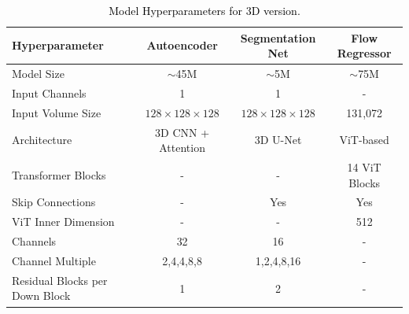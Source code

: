 \documentclass[twoside]{article}
\newcommand{\bc}[1]{\textcolor{black}{#1}}
\begin{document}
\vspace{0.5cm}

\begin{table}[th]
\centering
\caption{\bc{Model Hyperparameters for 3D version.}}
\label{tab:3d_all_params}
\begin{tabular}{lccc}
\toprule
\textbf{Hyperparameter}         & \textbf{Autoencoder}     & \textbf{Segmentation Net} & \textbf{Flow Regressor} \\
\midrule
Model Size                      & $\sim$45M          & $\sim$5M             & $\sim$75M          \\
Input Channels                  & 1                           & 1                             & -                           \\
Input Volume Size               & $128 \times 128 \times 128$  & $128 \times 128 \times 128$  & 131,072                     \\
Architecture                   & 3D CNN + Attention          & 3D U-Net                       & ViT-based                \\
Transformer Blocks              & -                           & -                             & 14 ViT Blocks               \\
Skip Connections                & -                           & Yes                           & Yes                         \\
ViT Inner Dimension             & -                           & -                             & 512                         \\
Channels                        &  32                        & 16                         & -            \\
Channel Multiple                & 2,4,4,8,8                  & 1,2,4,8,16                   & -    \\
Residual Blocks per Down Block  & 1                           & 2                           & -              \\


\end{tabular}
\end{table}
\end{document}
